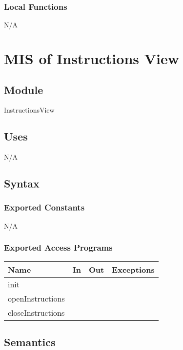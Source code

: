 \documentclass[12pt, titlepage]{article}
\begin{document}
	\subsubsection{Local Functions}
	
	N/A
	
	\newpage
	
	\section{MIS of Instructions View} \label{Module}
	
	\subsection{Module}
	
	InstructionsView
	
	\subsection{Uses}
	
	N/A
	
	\subsection{Syntax}
	
	\subsubsection{Exported Constants}
	
	N/A
	
	\subsubsection{Exported Access Programs}
	
	\begin{center}
		\begin{tabular}{l l l l}
			\hline
			\textbf{Name} & \textbf{In} & \textbf{Out} & \textbf{Exceptions} \\
			\hline
			init & & & \\
			openInstructions & &  &  \\
			closeInstructions &  &  &  \\
			\hline
		\end{tabular}
	\end{center}
	
	\subsection{Semantics}
	
\end{document}
